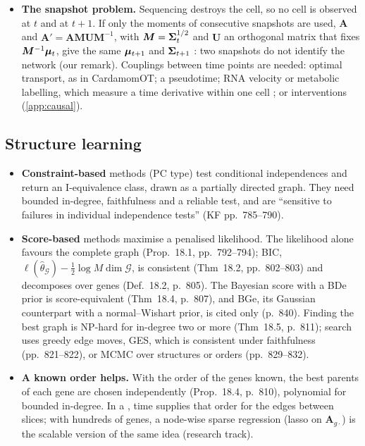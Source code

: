 \documentclass[11pt,a4paper]{article}
\begin{document}
\begin{itemize}
        state variables becomes dependent (entanglement, Thm~15.1, p.~658), and with switching regimes the exact
        belief state is a Gaussian mixture whose size grows exponentially in $t$ (pp.~683--685).
  \item \textbf{The snapshot problem.} Sequencing destroys the cell, so no cell is observed at $t$ and at
        $t+1$. If only the moments of consecutive snapshots are used, $\bm A$ and
        $\bm A'=\bm A\bm M\bm U\bm M^{-1}$, with $\bm M=\bm{\Sigma}_t^{1/2}$ and $\bm U$ an orthogonal matrix that fixes
        $\bm M^{-1}\bm{\mu}_t$, give the same $\bm{\mu}_{t+1}$ and $\bm{\Sigma}_{t+1}$ : two snapshots do not identify
        the network (our remark). Couplings between time points are needed: optimal transport, as in
        CardamomOT; a pseudotime; RNA velocity or metabolic labelling, which measure a time derivative within one
        cell \parencite{lamannoRNAVelocitySingle2018}; or interventions (\cref{app:causal}).
\end{itemize}

\subsection{Structure learning}\label{app:structure}

\begin{itemize}
  \item \textbf{Constraint-based} methods (PC type) test conditional independences and return an
        I-equivalence class, drawn as a partially directed graph. They need bounded in-degree, faithfulness and
        a reliable test, and are \enquote{sensitive to failures in individual independence tests} (KF
        pp.~785--790).
  \item \textbf{Score-based} methods maximise a penalised likelihood. The likelihood alone favours the complete
        graph (Prop.~18.1, pp.~792--794); BIC, $\ell(\hat\theta_{\mathcal G})-\tfrac12\log M\dim\mathcal G$, is
        consistent (Thm~18.2, pp.~802--803) and decomposes over genes (Def.~18.2, p.~805). The Bayesian score
        with a BDe prior is score-equivalent (Thm~18.4, p.~807), and BGe, its Gaussian counterpart with a
        normal--Wishart prior, is cited only (p.~840). Finding the best graph is NP-hard for in-degree two or more
        (Thm~18.5, p.~811); search uses greedy edge moves, GES, which is consistent under faithfulness
        (pp.~821--822), or MCMC over structures or orders (pp.~829--832).
  \item \textbf{A known order helps.} With the order of the genes known, the best parents of each gene are
        chosen independently (Prop.~18.4, p.~810), polynomial for bounded in-degree. In a , time
        supplies that order for the edges between slices; with hundreds of genes, a node-wise sparse regression
        (lasso on $\bm A_{g\cdot}$) is the scalable version of the same idea (research track).
\end{itemize}
\end{document}
